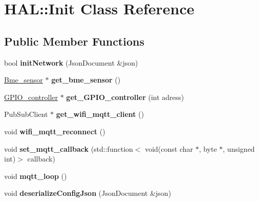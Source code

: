\hypertarget{class_h_a_l_1_1_init}{}\section{H\+AL\+:\+:Init Class Reference}
\label{class_h_a_l_1_1_init}
\subsection*{Public Member Functions}
\begin{DoxyCompactItemize}
\item 
\mbox{\label{class_h_a_l_1_1_init_a0ba61c57debf95c76d5e9c18041be711}} 
bool {\bfseries init\+Network} (Json\+Document \&json)
\item 
\mbox{\label{class_h_a_l_1_1_init_aa606269ddf90f9d98a78fb7704fd3944}} 
\hyperlink{class_h_a_l_1_1_bme__sensor}{Bme\+\_\+sensor} $\ast$ {\bfseries get\+\_\+bme\+\_\+sensor} ()
\item 
\mbox{\label{class_h_a_l_1_1_init_aeb92713d53bcd0a686ce275a371e545c}} 
\hyperlink{class_h_a_l_1_1_g_p_i_o__controller}{G\+P\+I\+O\+\_\+controller} $\ast$ {\bfseries get\+\_\+\+G\+P\+I\+O\+\_\+controller} (int adress)
\item 
\mbox{\label{class_h_a_l_1_1_init_a4979a083535df82a9d606f67aaec8b72}} 
Pub\+Sub\+Client $\ast$ {\bfseries get\+\_\+wifi\+\_\+mqtt\+\_\+client} ()
\item 
\mbox{\label{class_h_a_l_1_1_init_ae1b45c5312cf62dce0d0cc5c995ccc08}} 
void {\bfseries wifi\+\_\+mqtt\+\_\+reconnect} ()
\item 
\mbox{\label{class_h_a_l_1_1_init_add3c04192c256d9a4618b8607eb40344}} 
void {\bfseries set\+\_\+mqtt\+\_\+callback} (std\+::function$<$ void(const char $\ast$, byte $\ast$, unsigned int)$>$ callback)
\item 
\mbox{\label{class_h_a_l_1_1_init_a9c32afdf8d8269da5051b0b8e5e199e7}} 
void {\bfseries mqtt\+\_\+loop} ()
\item 
\mbox{\label{class_h_a_l_1_1_init_a231bf97527dba71dcf5348bb6562197d}} 
void {\bfseries deserialize\+Config\+Json} (Json\+Document \&json)
\end{DoxyCompactItemize}
